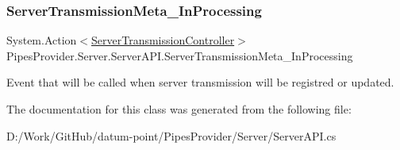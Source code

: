 \subsubsection{\texorpdfstring{Server\+Transmission\+Meta\+\_\+\+In\+Processing}{ServerTransmissionMeta\_InProcessing}}
{\footnotesize\ttfamily System.\+Action$<$\mbox{\hyperlink{class_pipes_provider_1_1_server_1_1_server_transmission_controller}{Server\+Transmission\+Controller}}$>$ Pipes\+Provider.\+Server.\+Server\+A\+P\+I.\+Server\+Transmission\+Meta\+\_\+\+In\+Processing\hspace{0.3cm}{\ttfamily [static]}}



Event that will be called when server transmission will be registred or updated. 



The documentation for this class was generated from the following file\+:\begin{DoxyCompactItemize}
\item 
D\+:/\+Work/\+Git\+Hub/datum-\/point/\+Pipes\+Provider/\+Server/Server\+A\+P\+I.\+cs\end{DoxyCompactItemize}
